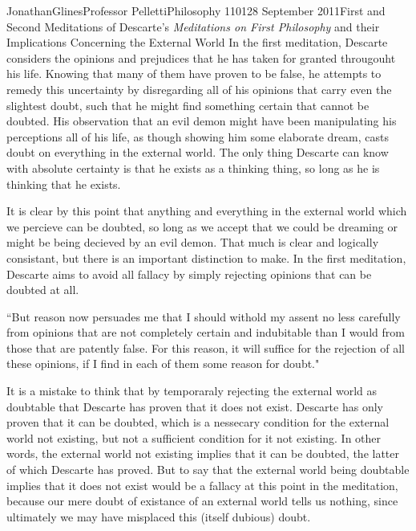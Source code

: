 \documentclass[12pt, letterpaper]{article}
\begin{document}
\begin{mla}{Jonathan}{Glines}{Professor Pelletti}{Philosophy 1101}{28 September 2011}{First and Second Meditations of Descarte's \textit{Meditations on First Philosophy} and their Implications Concerning the External World}
In the first meditation, Descarte considers the opinions and prejudices that he has taken for granted througouht his life. Knowing that many of them have proven to be false, he attempts to remedy this uncertainty by disregarding all of his opinions that carry even the slightest doubt, such that he might find something certain that cannot be doubted. His observation that an evil demon might have been manipulating his perceptions all of his life, as though showing him some elaborate dream, casts doubt on everything in the external world. The only thing Descarte can know with absolute certainty is that he exists as a thinking thing, so long as he is thinking that he exists.

It is clear by this point that anything and everything in the external world which we percieve can be doubted, so long as we accept that we could be dreaming or might be being decieved by an evil demon. That much is clear and logically consistant, but there is an important distinction to make. In the first meditation, Descarte aims to avoid all fallacy by simply rejecting opinions that can be doubted at all.
\begin{mlaquote}
``But reason now persuades me that I should withold my assent no less carefully from opinions that are not completely certain and indubitable than I would from those that are patently false. For this reason, it will suffice for the rejection of all these opinions, if I find in each of them some reason for doubt."
\end{mlaquote}
It is a mistake to think that by temporaraly rejecting the external world as doubtable that Descarte has proven that it does not exist. Descarte has only proven that it can be doubted, which is a nessecary condition for the external world not existing, but not a sufficient condition for it not existing. In other words, the external world not existing implies that it can be doubted, the latter of which Descarte has proved. But to say that the external world being doubtable implies that it does not exist would be a fallacy at this point in the meditation, because our mere doubt of existance of an external world tells us nothing, since ultimately we may have misplaced this (itself dubious) doubt.


\end{mla}
\end{document}
